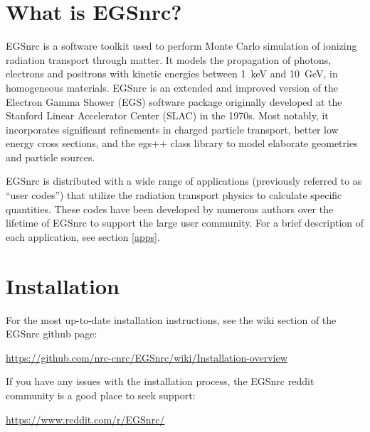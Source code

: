 \documentclass[12pt,twoside]{article}
\begin{document}
\newpage
\mbox{}	%
\newpage
\setcounter{page}{1}
\pagestyle{fancy}

\tableofcontents

\newpage


\section{What is EGSnrc?}
EGSnrc is a software toolkit used to perform Monte Carlo simulation of
ionizing radiation transport through matter. It models the propagation
of photons, electrons and positrons with kinetic energies between
1~keV and 10~GeV, in homogeneous materials. EGSnrc is an
extended and improved version of the Electron Gamma Shower (EGS)
software package originally developed at the Stanford Linear Accelerator
Center (SLAC) in the 1970s. Most notably, it incorporates significant
refinements in charged particle transport, better low energy cross
sections, and the egs++ class library to model elaborate geometries and
particle sources.

EGSnrc is distributed with a wide range of applications (previously referred to
as ``user codes'') that utilize the radiation transport physics to calculate
specific quantities. These codes have been developed by numerous authors over
the lifetime of EGSnrc to support the large user community. For a brief
description of each application, see section \ref{apps}.

\section{Installation}

For the most up-to-date installation instructions, see the wiki section of the
EGSnrc github page:

\href{https://github.com/nrc-cnrc/EGSnrc/wiki/Installation-overview}{https://github.com/nrc-cnrc/EGSnrc/wiki/Installation-overview}


If you have any issues with the installation process, the EGSnrc reddit community is a good place to seek support:

\href{https://www.reddit.com/r/EGSnrc/}{https://www.reddit.com/r/EGSnrc/}

\end{document}
